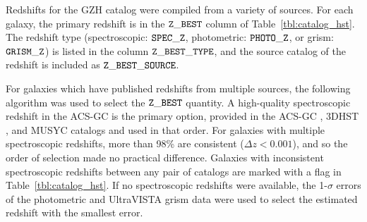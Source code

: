 \documentclass[twocolumn]{aastex6}
\begin{document}
Redshifts for the GZH catalog were compiled from a variety of sources. For each
galaxy, the primary redshift is in the $\tt Z\_BEST$ column of
Table~\ref{tbl:catalog_hst}. The redshift type (spectroscopic: $\tt SPEC\_Z$,
photometric: $\tt PHOTO\_Z$, or grism: $ \tt GRISM\_Z$) is listed in the column
$\tt Z\_BEST\_TYPE$, and the source catalog of the redshift is included as $\tt
Z\_BEST\_SOURCE$. 

For galaxies which have published redshifts from multiple sources, the
following algorithm was used to select the $\tt Z\_BEST$ quantity. A
high-quality spectroscopic redshift in the ACS-GC is the primary option,
provided in the ACS-GC \citep{gri12}, 3DHST \citep{mom15}, and MUSYC
\citep{car10} catalogs and used in that order. For galaxies with multiple
spectroscopic redshifts, more than 98\% are consistent ($\Delta z<0.001$), and
so the order of selection made no practical difference. Galaxies with
inconsistent spectroscopic redshifts between any pair of catalogs are marked
with a flag in Table~\ref{tbl:catalog_hst}. If no spectroscopic redshifts were
available, the 1-$\sigma$ errors of the photometric \citep[ACS-GC, 3DHST,
MUSYC, UltraVISTA;][]{ilb13} and UltraVISTA grism data were used to select the
estimated redshift with the smallest error. 
 
\end{document}
